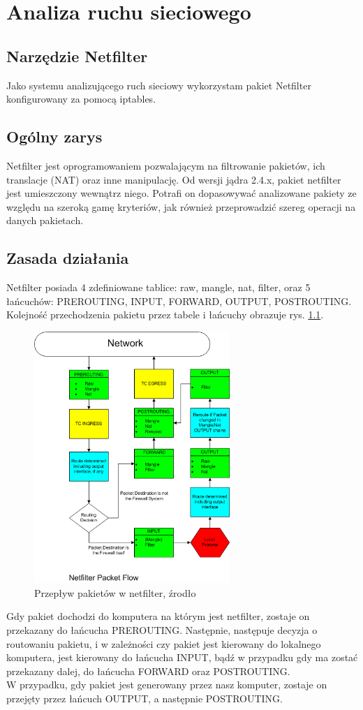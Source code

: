 \chapter{Analiza ruchu sieciowego}
	\label{chap:analiza}
	\section{Narzędzie Netfilter}
		Jako systemu analizującego ruch sieciowy wykorzystam pakiet Netfilter konfigurowany za pomocą iptables.
	\section{Ogólny zarys}
		Netfilter jest oprogramowaniem pozwalającym na filtrowanie pakietów, ich translacje (NAT) oraz inne manipulację.
		Od wersji jądra 2.4.x, pakiet netfilter jest umieszczony wewnątrz niego.
		Potrafi on dopasowywać analizowane pakiety ze względu na szeroką gamę kryteriów, jak również przeprowadzić szereg operacji na danych pakietach.
	\section{Zasada działania}
		Netfilter posiada 4 zdefiniowane tablice: raw, mangle, nat, filter, oraz 5 łańcuchów: PREROUTING, INPUT, FORWARD, OUTPUT, POSTROUTING.
		Kolejność przechodzenia pakietu przez tabele i łańcuchy obrazuje rys. \ref{fig:flowchart}.\\
		\begin{figure}[h]
			\centering
				\includegraphics[width=280px]{Netfilter.png}
				\caption{Przepływ pakietów w netfilter, źrodło \cite{netfilter}}
				\label{fig:flowchart}
		\end{figure}
		Gdy pakiet dochodzi do komputera na którym jest netfilter, zostaje on przekazany do łańcucha PREROUTING. Następnie, następuje decyzja o routowaniu pakietu, i w zależności czy pakiet jest kierowany do lokalnego komputera, jest kierowany do łańcucha INPUT, bądź w przypadku gdy ma zostać przekazany dalej, do łańcucha FORWARD oraz POSTROUTING.\\
		W przypadku, gdy pakiet jest generowany przez nasz komputer, zostaje on przejęty przez łańcuch OUTPUT, a następnie POSTROUTING.

